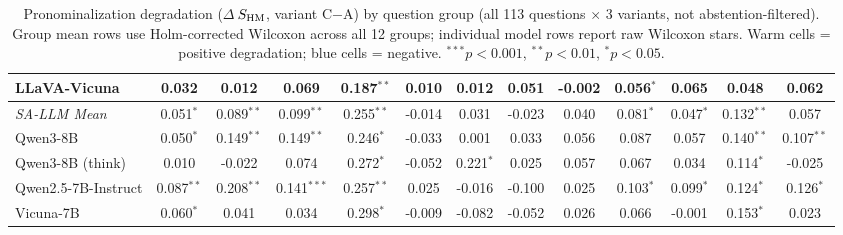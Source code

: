 \begin{table}[h]
\begin{tabular}{lcccccccccccc}
\quad LLaVA-Vicuna & \cellcolor{orange!12}0.032 & \cellcolor{orange!12}0.012 & \cellcolor{orange!24}0.069 & \cellcolor{orange!36}0.187$^{**}$ & \cellcolor{orange!12}0.010 & \cellcolor{orange!12}0.012 & \cellcolor{orange!12}0.051 & -0.002 & \cellcolor{orange!12}0.056$^{*}$ & \cellcolor{orange!24}0.065 & \cellcolor{orange!12}0.048 & \cellcolor{orange!24}0.062 \\
\midrule
\rowcolor{gray!12}\textit{SA-LLM Mean} & \cellcolor{orange!12}0.051$^{*}$ & \cellcolor{orange!24}0.089$^{**}$ & \cellcolor{orange!24}0.099$^{**}$ & \cellcolor{orange!36}0.255$^{**}$ & \cellcolor{blue!10}-0.014 & \cellcolor{orange!12}0.031 & \cellcolor{blue!10}-0.023 & \cellcolor{orange!12}0.040 & \cellcolor{orange!24}0.081$^{*}$ & \cellcolor{orange!12}0.047$^{*}$ & \cellcolor{orange!24}0.132$^{**}$ & \cellcolor{orange!12}0.057 \\
\quad Qwen3-8B & \cellcolor{orange!12}0.050$^{*}$ & \cellcolor{orange!24}0.149$^{**}$ & \cellcolor{orange!24}0.149$^{**}$ & \cellcolor{orange!36}0.246$^{*}$ & \cellcolor{blue!10}-0.033 & 0.001 & \cellcolor{orange!12}0.033 & \cellcolor{orange!12}0.056 & \cellcolor{orange!24}0.087 & \cellcolor{orange!12}0.057 & \cellcolor{orange!24}0.140$^{**}$ & \cellcolor{orange!24}0.107$^{**}$ \\
\quad Qwen3-8B (think) & 0.010 & \cellcolor{blue!10}-0.022 & \cellcolor{orange!24}0.074 & \cellcolor{orange!36}0.272$^{*}$ & \cellcolor{blue!10}-0.052 & \cellcolor{orange!36}0.221$^{*}$ & \cellcolor{orange!12}0.025 & \cellcolor{orange!12}0.057 & \cellcolor{orange!24}0.067 & \cellcolor{orange!12}0.034 & \cellcolor{orange!24}0.114$^{*}$ & \cellcolor{blue!10}-0.025 \\
\quad Qwen2.5-7B-Instruct & \cellcolor{orange!24}0.087$^{**}$ & \cellcolor{orange!36}0.208$^{**}$ & \cellcolor{orange!24}0.141$^{***}$ & \cellcolor{orange!36}0.257$^{**}$ & \cellcolor{orange!12}0.025 & \cellcolor{blue!10}-0.016 & \cellcolor{blue!10}-0.100 & \cellcolor{orange!12}0.025 & \cellcolor{orange!24}0.103$^{*}$ & \cellcolor{orange!24}0.099$^{*}$ & \cellcolor{orange!24}0.124$^{*}$ & \cellcolor{orange!24}0.126$^{*}$ \\
\quad Vicuna-7B & \cellcolor{orange!12}0.060$^{*}$ & \cellcolor{orange!12}0.041 & \cellcolor{orange!12}0.034 & \cellcolor{orange!36}0.298$^{*}$ & -0.009 & \cellcolor{blue!10}-0.082 & \cellcolor{blue!10}-0.052 & \cellcolor{orange!12}0.026 & \cellcolor{orange!24}0.066 & -0.001 & \cellcolor{orange!36}0.153$^{*}$ & \cellcolor{orange!12}0.023 \\
\bottomrule
\end{tabular}
\caption{Pronominalization degradation ($\Delta$\,$\sHM$, variant C$-$A) by question group (all 113 questions $\times$ 3 variants, not abstention-filtered). Group mean rows use Holm-corrected Wilcoxon across all 12 groups; individual model rows report raw Wilcoxon stars. Warm cells = positive degradation; blue cells = negative. $^{***}p{<}0.001$, $^{**}p{<}0.01$, $^{*}p{<}0.05$.}
\label{tab:degradation_wilcoxon}
\end{table}
